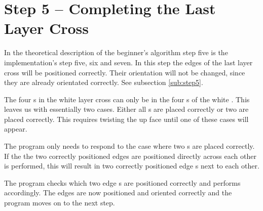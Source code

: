 \section{Step 5 -- Completing the Last Layer Cross}
In the theoretical description of the beginner's algorithm step five is the implementation's step five, six and seven. 
In this step the edges of the last layer cross will be positioned correctly. Their orientation will not be changed, since they are already orientated correctly. See subsection \ref{sub:step5}.

The four \cpiece{}s in the white layer cross can only be in the four \cubicle{}s of the white \face{}. This leaves us with essentially two cases. Either all \cpiece{}s are placed correctly or two are placed correctly. This requires twisting the up face until one of these cases will appear.

The program only needs to respond to the case where two \cpiece{}s are placed correctly. 
If the the two correctly positioned edges are positioned directly across each other  is performed, this will result in two correctly positioned edge \cubie{}s next to each other.

The program checks which two edge \cpiece{}s are positioned correctly and performs  accordingly. 
The edges are now positioned and oriented correctly and the program moves on to the next step.